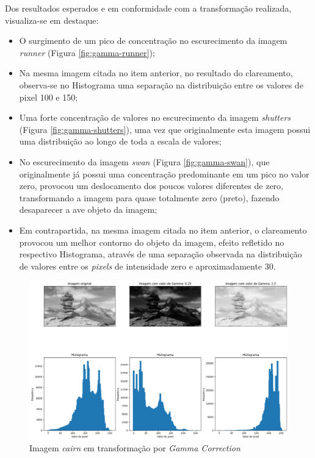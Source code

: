 Dos resultados esperados e em conformidade com a transformação realizada, visualiza-se em destaque:

\begin{itemize}
    \item O surgimento de um pico de concentração no escurecimento da imagem \textit{runner} (Figura \ref{fig:gamma-runner});
    \item Na mesma imagem citada no item anterior, no resultado do clareamento, observa-se no Histograma uma separação na distribuição entre os valores de pixel 100 e 150;
    \item Uma forte concentração de valores no escurecimento da imagem \textit{shutters} (Figura \ref{fig:gamma-shutters}), uma vez que originalmente esta imagem possui uma distribuição ao longo de toda a escala de valores;
    \item No escurecimento da imagem \textit{swan} (Figura \ref{fig:gamma-swan}), que originalmente já possui uma concentração predominante em um pico no valor zero, provocou um deslocamento dos poucos valores diferentes de zero, transformando a imagem para quase totalmente zero (preto), fazendo desaparecer a ave objeto da imagem;
    \item Em contrapartida, na mesma imagem citada no item anterior, o clareamento provocou um melhor contorno do objeto da imagem, efeito refletido no respectivo Histograma, através de uma separação observada na distribuição de valores entre os \textit{pixels} de intensidade zero e aproximadamente 30.
\end{itemize}


\begin{figure}
    \includegraphics[width=1\linewidth]{Elementos/Figuras/resultados-gamma-cairn.png}
    \caption{Imagem \textit{cairn} em transformação por \textit{Gamma Correction}}
    \label{fig:gamma-cairn}
\end{figure}


